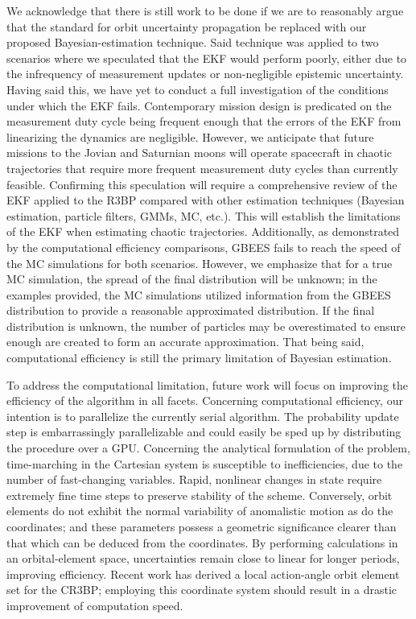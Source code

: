 \documentclass[paper,11pt]{AAS}
\begin{document}
We acknowledge that there is still work to be done if we are to reasonably argue that the standard for orbit uncertainty propagation be replaced with our proposed Bayesian-estimation technique. Said technique was applied to two scenarios where we speculated that the EKF would perform poorly, either due to the infrequency of measurement updates or non-negligible epistemic uncertainty. Having said this, we have yet to conduct a full investigation of the conditions under which the EKF fails. Contemporary mission design is predicated on the measurement duty cycle being frequent enough that the errors of the EKF from linearizing the dynamics are negligible. However, we anticipate that future missions to the Jovian and Saturnian moons will operate spacecraft in chaotic trajectories that require more frequent measurement duty cycles than currently feasible. Confirming this speculation will require a comprehensive review of the EKF applied to the R3BP compared with other estimation techniques (Bayesian estimation, particle filters, GMMs, MC, etc.). This will establish the limitations of the EKF when estimating chaotic trajectories. Additionally, as demonstrated by the computational efficiency comparisons, GBEES fails to reach the speed of the MC simulations for both scenarios. However, we emphasize that for a true MC simulation, the spread of the final distribution will be unknown; in the examples provided, the MC simulations utilized information from the GBEES distribution to provide a reasonable approximated distribution. If the final distribution is unknown, the number of particles may be overestimated to ensure enough are created to form an accurate approximation. That being said, computational efficiency is still the primary limitation of Bayesian estimation. 

To address the computational limitation, future work will focus on improving the efficiency of the algorithm in all facets. Concerning computational efficiency, our intention is to parallelize the currently serial algorithm. The probability update step is embarrassingly parallelizable and could easily be sped up by distributing the procedure over a GPU. Concerning the analytical formulation of the problem, time-marching in the Cartesian system is susceptible to inefficiencies, due to the number of fast-changing variables. Rapid, nonlinear changes in state require extremely fine time steps to preserve stability of the scheme. Conversely, orbit elements do not exhibit the normal variability of anomalistic motion as do the coordinates; and these parameters possess a geometric significance clearer than that which can be deduced from the coordinates. By performing calculations in an orbital-element space, uncertainties remain close to linear for longer periods, improving efficiency. Recent work has derived a local action-angle orbit element set for the CR3BP; employing this coordinate system should result in a drastic improvement of computation speed.
\end{document}
